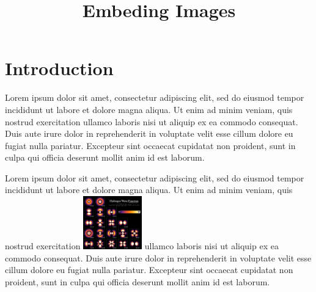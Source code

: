 \documentclass[]{article}
\title{Embeding Images}
\author{}
\date{}
\begin{document}
\maketitle

\section{Introduction}
Lorem ipsum dolor sit amet, consectetur adipiscing elit, sed do eiusmod tempor incididunt ut labore et dolore magna aliqua. Ut enim ad minim veniam, quis nostrud exercitation ullamco laboris nisi ut aliquip ex ea commodo consequat. Duis aute irure dolor in reprehenderit in voluptate velit esse cillum dolore eu fugiat nulla pariatur. Excepteur sint occaecat cupidatat non proident, sunt in culpa qui officia deserunt mollit anim id est laborum.

Lorem ipsum dolor sit amet, consectetur adipiscing elit, sed do eiusmod tempor incididunt ut labore et dolore magna aliqua. Ut enim ad minim veniam, quis nostrud exercitation 
\includegraphics[width=1in]{Hydrogen_Density_Plots}  %
ullamco laboris nisi ut aliquip ex ea commodo consequat. Duis aute irure dolor in reprehenderit in voluptate velit esse cillum dolore eu fugiat nulla pariatur. Excepteur sint occaecat cupidatat non proident, sunt in culpa qui officia deserunt mollit anim id est laborum.
\end{document}
